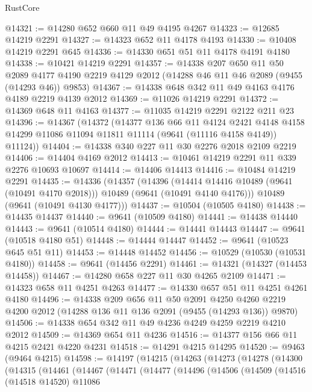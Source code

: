 \begin{lexlean}{RustCore}
\begin{coremodule}
@14321 := @14280 @652 @660 @11 @49 @4195 @4267
@14323 := @12685 @14219 @2291
@14327 := @14323 @652 @11 @4178 @4193
@14330 := @10408 @14219 @2291 @645
@14336 := @14330 @651 @51 @11 @4178 @4191 @4180
@14338 := @10421 @14219 @2291
@14357 := @14338
    @207
    @650
    @11
    @50
    @2089
    @4177
    @4190
    @2219
    @4129
    @2012
    (@14288 @46 @11 @46 @2089 (@9455 (@14293 @46)) @9853)
@14367 := @14338 @648 @342 @11 @49 @4163 @4176 @4189 @2219 @4139 @2012
@14369 := @11026 @14219 @2291
@14372 := @14369 @648 @11 @4163
@14377 := @11035 @14219 @2291 @2122 @211 @23
@14396 := @14367
    (@14372
      (@14377
        @136
        @66
        @11
        @4124
        @2421
        @4148
        @4158
        @14299
        @11086
        @11094
        @11811
        @11114
        (@9641 (@11116 @4158 @4149))
        @11124))
@14404 := @14338 @340 @227 @11 @30 @2276 @2018 @2109 @2219
@14406 := @14404 @4169 @2012
@14413 := @10461 @14219 @2291 @11 @339 @2276 @10693 @10697
@14414 := @14406 @14413
@14416 := @10484 @14219 @2291
@14435 := @14336
    (@14357
      (@14396
        (@14414 @14416 @10489 (@9641 (@10491 @4170 @2018)))
        @10489
        (@9641 (@10491 @4140 @4176)))
      @10489
      (@9641 (@10491 @4130 @4177)))
@14437 := @10504 (@10505 @4180)
@14438 := @14435 @14437
@14440 := @9641 (@10509 @4180)
@14441 := @14438 @14440
@14443 := @9641 (@10514 @4180)
@14444 := @14441 @14443
@14447 := @9641 (@10518 @4180 @51)
@14448 := @14444 @14447
@14452 := @9641 (@10523 @645 @51 @11)
@14453 := @14448 @14452
@14456 := @10529 (@10530 (@10531 @4180))
@14458 := @9641 (@14456 @2291)
@14461 := @14321 (@14327 (@14453 @14458))
@14467 := @14280 @658 @227 @11 @30 @4265 @2109
@14471 := @14323 @658 @11 @4251 @4263
@14477 := @14330 @657 @51 @11 @4251 @4261 @4180
@14496 := @14338
    @209
    @656
    @11
    @50
    @2091
    @4250
    @4260
    @2219
    @4200
    @2012
    (@14288 @136 @11 @136 @2091 (@9455 (@14293 @136)) @9870)
@14506 := @14338 @654 @342 @11 @49 @4236 @4249 @4259 @2219 @4210 @2012
@14509 := @14369 @654 @11 @4236
@14516 := @14377 @156 @66 @11 @4215 @2421 @4220 @4231
@14518 := @14291 @4215 @14295
@14520 := @9463 (@9464 @4215)
@14598 := @14197
    (@14215
      (@14263
        (@14273
          (@14278
            (@14300
              (@14315
                (@14461
                  (@14467
                    (@14471
                      (@14477
                        (@14496
                          (@14506
                            (@14509
                              (@14516
                                (@14518 @14520)
                                @11086

\end{coremodule}
\end{lexlean}
